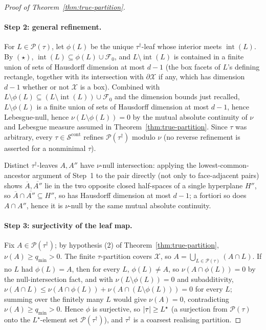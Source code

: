 \documentclass[11pt]{article}
\theoremstyle{plain}
\theoremstyle{definition}
\theoremstyle{remark}
\newcommand{\cX}{\mathcal{X}}
\newcommand{\cS}{\mathcal{S}}
\newcommand{\cP}{\mathcal{P}}
\newcommand{\cF}{\mathcal{F}}
\DeclarePairedDelimiter{\card}{\lvert}{\rvert}
\begin{document}
\begin{proof}[Proof of Theorem~\ref{thm:true-partition}]
\paragraph*{Step 2: general refinement.}
For \(L\in\cP(\tau)\), let \(\phi(L)\) be the unique \(\tau^{\dagger}\)-leaf
whose interior meets \(\operatorname{int}(L)\). By \((\star)\),
\(\operatorname{int}(L)\subseteq\phi(L)\cup\cF_0\), and
\(L\setminus\operatorname{int}(L)\) is contained in a finite union of sets
of Hausdorff dimension at most \(d-1\) (the box facets of \(L\)'s defining
rectangle, together with its intersection with \(\partial\cX\) if any,
which has dimension \(d-1\) whether or not \(\cX\) is a box). Combined with
\(L\setminus\phi(L)\subseteq(L\setminus\operatorname{int}(L))\cup\cF_0\)
and the dimension bounds just recalled, \(L\setminus\phi(L)\) is a finite
union of sets of Hausdorff dimension at most \(d-1\), hence Lebesgue-null,
hence \(\nu(L\setminus\phi(L))=0\) by the mutual absolute continuity of
\(\nu\) and Lebesgue measure assumed in Theorem~\ref{thm:true-partition}.
Since \(\tau\) was
arbitrary, every \(\tau\in\cS^{\mathrm{cont}}\) refines
\(\cP(\tau^{\dagger})\) modulo \(\nu\) (no reverse refinement is asserted
for a nonminimal \(\tau\)).

Distinct \(\tau^{\dagger}\)-leaves \(A,A''\) have \(\nu\)-null intersection:
applying the lowest-common-ancestor argument of Step~1 to the pair directly
(not only to face-adjacent pairs) shows \(\overline A,\overline{A''}\) lie
in the two opposite closed half-spaces of a single hyperplane \(H''\), so
\(\overline A\cap\overline{A''}\subseteq H''\), so has Hausdorff dimension
at most \(d-1\); a fortiori so does \(A\cap A''\), hence it is \(\nu\)-null
by the same mutual absolute continuity.

\paragraph*{Step 3: surjectivity of the leaf map.}
Fix \(A\in\cP(\tau^{\dagger})\); by hypothesis (2) of
Theorem~\ref{thm:true-partition}, \(\nu(A)\ge q_{\min}>0\). The
finite \(\tau\)-partition covers \(\cX\), so
\(A=\bigcup_{L\in\cP(\tau)}(A\cap L)\). If no \(L\) had \(\phi(L)=A\), then
for every \(L\), \(\phi(L)\ne A\), so \(\nu(A\cap\phi(L))=0\) by the
null-intersection fact, and with \(\nu(L\setminus\phi(L))=0\) and
subadditivity, \(\nu(A\cap L)\le\nu(A\cap\phi(L))+\nu(A\cap(L\setminus\phi(L)))=0\)
for every \(L\); summing over the finitely many \(L\) would give
\(\nu(A)=0\), contradicting \(\nu(A)\ge q_{\min}>0\). Hence \(\phi\) is
surjective, so \(\card\tau\ge L^\star\) (a surjection from
\(\cP(\tau)\) onto the \(L^\star\)-element set
\(\cP(\tau^{\dagger})\)), and \(\tau^{\dagger}\) is a coarsest realising
partition.


\end{proof}
\end{document}
